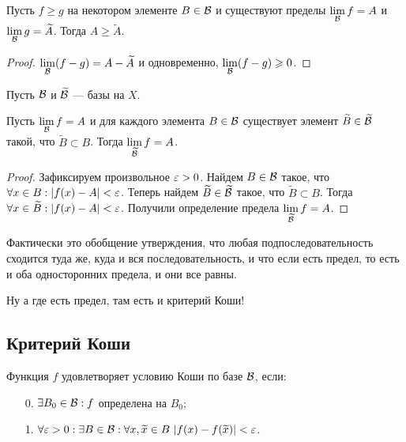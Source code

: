 \documentclass[a4paper, 12pt]{article}
\begin{document}
\begin{Consequence}
Пусть $f \geq g$ на некотором элементе $B \in \mathcal{B}$ и существуют пределы $\lim\limits_{\mathcal{B}}f = A$ и $\lim\limits_{\mathcal{B}}g = \widetilde{A}$. Тогда $A \geq \widetilde{A}$.
\end{Consequence}
\begin{proof}
$\lim\limits_{\mathcal{B}}(f - g) = A - \widetilde{A}$ и одновременно, $\lim\limits_{\mathcal{B}}(f - g) \geqslant 0$.
\end{proof}

Пусть $\mathcal{B}$ и $\widetilde{\mathcal{B}}$ --- базы на $X$.
\begin{Statement}
Пусть $\lim\limits_{\mathcal{B}}f = A$ и для каждого элемента $B \in \mathcal{B}$ существует элемент $\widetilde{B} \in \widetilde{\mathcal{B}}$ такой, что $\widetilde{B} \subset B$. Тогда $\lim\limits_{\widetilde{\mathcal{B}}}f = A$.
\end{Statement}

\begin{proof}
Зафиксируем произвольное $\varepsilon > 0$. Найдем $B \in \mathcal{B}$ такое, что $\forall x \in B: |f(x) - A| < \varepsilon$.
Теперь найдем $\widetilde{B} \in \widetilde{\mathcal{B}}$ такое, что $\widetilde{B} \subset B$. Тогда $\forall x \in \widetilde{B}: |f(x) - A| < \varepsilon$. Получили определение предела $\lim\limits_{\widetilde{\mathcal{B}}}f = A$.
\end{proof}

Фактически это обобщение утверждения, что любая подпоследовательность сходится туда же, куда и вся последовательность, и что если есть предел, то есть и оба односторонних предела, и они все равны.

Ну а где есть предел, там есть и критерий Коши!

\subsection{Критерий Коши}

\begin{Def}
Функция $f$ удовлетворяет условию Коши по базе $\mathcal{B}$, если:
\begin{itemize}
\item[0.] $\exists B_0 \in \mathcal{B}: f$ определена на $B_0$;
\item[1.] $\forall \varepsilon > 0: \exists B \in \mathcal{B}: \forall x, \widetilde{x} \in B\ |f(x) - f(\widetilde{x})| < \varepsilon$.
\end{itemize}
\end{Def}
\end{document}
